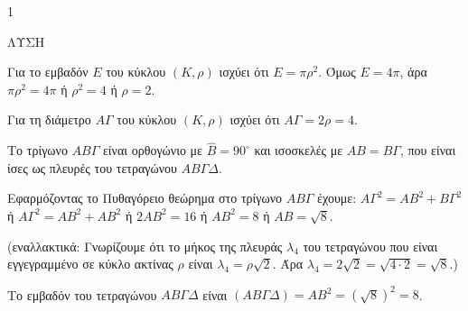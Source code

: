 \begin{ylh}{1}
    \item [Ύλη από εικόνα]
\end{ylh}
ΛΥΣΗ
\begin{alist}
\item Για το εμβαδόν $E$ του κύκλου $(K, \rho)$ ισχύει ότι $E=\pi\rho^2$. Όμως $E=4\pi$, άρα $\pi\rho^2=4\pi$ ή $\rho^2=4$ ή $\rho=2$. 
\item Για τη διάμετρο $A\Gamma$ του κύκλου $(K, \rho)$ ισχύει ότι $A\Gamma=2\rho=4$. 
\end{alist}
Το τρίγωνο $AB\Gamma$ είναι ορθογώνιο με $\hat{B}=90^\circ$ και ισοσκελές με $AB=B\Gamma$, που είναι ίσες ως πλευρές του τετραγώνου $AB\Gamma\Delta$.

Εφαρμόζοντας το Πυθαγόρειο θεώρημα στο τρίγωνο $AB\Gamma$ έχουμε:
$A\Gamma^2 = AB^2 + B\Gamma^2$ ή $A\Gamma^2 = AB^2 + AB^2$ ή $2AB^2 = 16$ ή $AB^2 = 8$ ή $AB = \sqrt{8}$.

(εναλλακτικά:
Γνωρίζουμε ότι το μήκος της πλευράς $\lambda_4$ του τετραγώνου που είναι εγγεγραμμένο σε κύκλο ακτίνας $\rho$ είναι $\lambda_4 = \rho\sqrt{2}$. Άρα $\lambda_4 = 2\sqrt{2} = \sqrt{4\cdot2} = \sqrt{8}$.)
\begin{alist}
\item Το εμβαδόν του τετραγώνου $AB\Gamma\Delta$ είναι $(AB\Gamma\Delta) = AB^2 = (\sqrt{8})^2 = 8$. 
\end{alist}